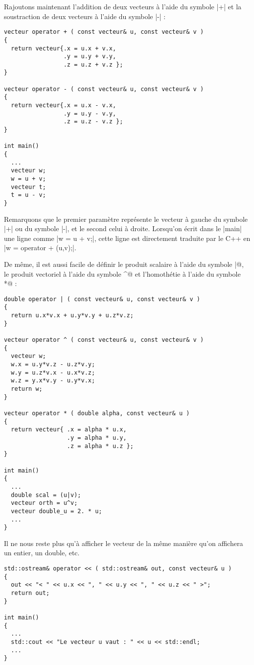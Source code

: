 Rajoutons maintenant l'addition de deux vecteurs à l'aide du symbole |+| et la soustraction de deux vecteurs
à l'aide du symbole |-| :

\begin{lstlisting}
vecteur operator + ( const vecteur& u, const vecteur& v )
{
  return vecteur{.x = u.x + v.x, 
                 .y = u.y + v.y, 
                 .z = u.z + v.z };
}

vecteur operator - ( const vecteur& u, const vecteur& v )
{
  return vecteur{.x = u.x - v.x, 
                 .y = u.y - v.y, 
                 .z = u.z - v.z };
}

int main()
{
  ...
  vecteur w;
  w = u + v;
  vecteur t;
  t = u - v;
}
\end{lstlisting}

Remarquons que le premier paramètre représente le vecteur à gauche du symbole |+| ou du symbole |-|, et le second celui à droite. Lorsqu'on écrit dans le |main| une ligne comme |w = u + v;|, cette ligne est directement traduite par le C++ en
|w = operator + (u,v);|.

De même, il est aussi facile de définir le produit scalaire à l'aide du symbole \verb@|@, le produit vectoriel à l'aide du symbole \verb@^@  et l'homothétie à l'aide du symbole \verb@*@ :
\begin{lstlisting}
double operator | ( const vecteur& u, const vecteur& v )
{
  return u.x*v.x + u.y*v.y + u.z*v.z;
}

vecteur operator ^ ( const vecteur& u, const vecteur& v )
{
  vecteur w;
  w.x = u.y*v.z - u.z*v.y;
  w.y = u.z*v.x - u.x*v.z;
  w.z = y.x*v.y - u.y*v.x;
  return w;
}

vecteur operator * ( double alpha, const vecteur& u )
{
  return vecteur{ .x = alpha * u.x,
                  .y = alpha * u.y,
                  .z = alpha * u.z };
}

int main()
{
  ...
  double scal = (u|v);
  vecteur orth = u^v;
  vecteur double_u = 2. * u;
  ...
}
\end{lstlisting}

Il ne nous reste plus qu'à afficher le vecteur de la même manière qu'on affichera un entier, un double, etc.

\begin{lstlisting}
std::ostream& operator << ( std::ostream& out, const vecteur& u )
{
  out << "< " << u.x << ", " << u.y << ", " << u.z << " >";
  return out;
}

int main()
{
  ...
  std::cout << "Le vecteur u vaut : " << u << std::endl;
  ...
}
\end{lstlisting}

